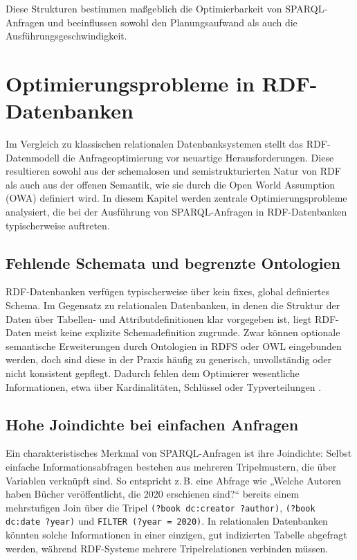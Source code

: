 \documentclass[12pt]{article}
\begin{document}
Diese Strukturen bestimmen maßgeblich die Optimierbarkeit von SPARQL-Anfragen und beeinflussen sowohl den Planungsaufwand als auch die Ausführungsgeschwindigkeit.

\section{Optimierungsprobleme in RDF-Datenbanken} \label{sec:probleme}

Im Vergleich zu klassischen relationalen Datenbanksystemen stellt das RDF-Datenmodell die Anfrageoptimierung vor neuartige Herausforderungen. Diese resultieren sowohl aus der schemalosen und semistrukturierten Natur von RDF als auch aus der offenen Semantik, wie sie durch die Open World Assumption (OWA) definiert wird. In diesem Kapitel werden zentrale Optimierungsprobleme analysiert, die bei der Ausführung von SPARQL-Anfragen in RDF-Datenbanken typischerweise auftreten.

\subsection{Fehlende Schemata und begrenzte Ontologien}

RDF-Datenbanken verfügen typischerweise über kein fixes, global definiertes Schema. Im Gegensatz zu relationalen Datenbanken, in denen die Struktur der Daten über Tabellen- und Attributdefinitionen klar vorgegeben ist, liegt RDF-Daten meist keine explizite Schemadefinition zugrunde. Zwar können optionale semantische Erweiterungen durch Ontologien in RDFS oder OWL eingebunden werden, doch sind diese in der Praxis häufig zu generisch, unvollständig oder nicht konsistent gepflegt. Dadurch fehlen dem Optimierer wesentliche Informationen, etwa über Kardinalitäten, Schlüssel oder Typverteilungen \cite{harth2010sparqling}.

\subsection{Hohe Joindichte bei einfachen Anfragen}

Ein charakteristisches Merkmal von SPARQL-Anfragen ist ihre Joindichte: Selbst einfache Informationsabfragen bestehen aus mehreren Tripelmustern, die über Variablen verknüpft sind. So entspricht z.\,B. eine Abfrage wie „Welche Autoren haben Bücher veröffentlicht, die 2020 erschienen sind?“ bereits einem mehrstufigen Join über die Tripel \texttt{(?book dc:creator ?author)}, \texttt{(?book dc:date ?year)} und \texttt{FILTER (?year = 2020)}. In relationalen Datenbanken könnten solche Informationen in einer einzigen, gut indizierten Tabelle abgefragt werden, während RDF-Systeme mehrere Tripelrelationen verbinden müssen.
\end{document}
